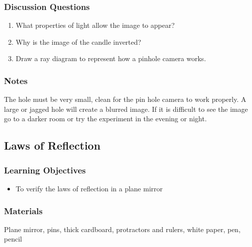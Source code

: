 \subsubsection*{Discussion Questions}
\begin{enumerate}
\item{What properties of light allow the image to appear?}
\item{Why is the image of the candle inverted?}
\item{Draw a ray diagram to represent how a pinhole camera works.}
\end{enumerate}

\subsubsection*{Notes}
The hole must be very small, clean for the pin hole camera to work properly. A large or jagged hole will create a blurred image.  
If it is difficult to see the image go to a darker room or try the experiment in the evening or night.


\subsection{Laws of Reflection}

\subsubsection*{Learning Objectives}
\begin{itemize}
\item{To verify the laws of reflection in a plane mirror}
\end{itemize}

\subsubsection*{Materials}
Plane mirror, pins, thick cardboard, protractors and rulers, white paper, pen, pencil


